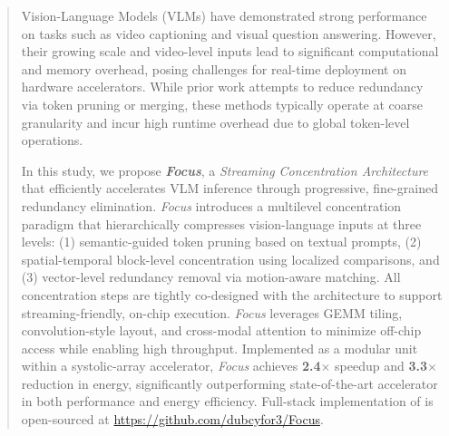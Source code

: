 \begin{abstract}
Vision-Language Models (VLMs) have demonstrated strong performance on tasks such as video captioning and visual question answering. 
However, their growing scale and video-level inputs lead to significant computational and memory overhead, posing challenges for real-time deployment on hardware accelerators. 
While prior work attempts to reduce redundancy via token pruning or merging, these methods typically operate at coarse granularity and incur high runtime overhead due to global token-level operations.

In this study, we propose \textbf{\textit{Focus}}, a \textit{Streaming Concentration Architecture} that efficiently accelerates VLM inference through progressive, fine-grained redundancy elimination. 
\textit{Focus} introduces a multilevel concentration paradigm that hierarchically compresses vision-language inputs at three levels: 
(1) semantic-guided token pruning based on textual prompts, 
(2) spatial-temporal block-level concentration using localized comparisons, 
and (3) vector-level redundancy removal via motion-aware matching.
All concentration steps are tightly co-designed with the architecture to support streaming-friendly, on-chip execution. 
\textit{Focus} leverages GEMM tiling, convolution-style layout, and cross-modal attention to minimize off-chip access while enabling high throughput. 
Implemented as a modular unit within a systolic-array accelerator, \textit{Focus} achieves {\textbf{2.4$\times$} speedup and \textbf{3.3$\times$} reduction in energy}, significantly outperforming {state-of-the-art accelerator} in both performance and energy efficiency. Full-stack implementation of \proj is open-sourced at \href{https://github.com/dubcyfor3/Focus}{https://github.com/dubcyfor3/Focus}.
\end{abstract}
